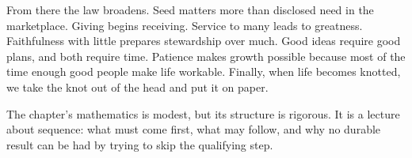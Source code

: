 From there the law broadens. Seed matters more than disclosed need in the marketplace. Giving begins receiving. Service to many leads to greatness. Faithfulness with little prepares stewardship over much. Good ideas require good plans, and both require time. Patience makes growth possible because most of the time enough good people make life workable. Finally, when life becomes knotted, we take the knot out of the head and put it on paper.

The chapter's mathematics is modest, but its structure is rigorous. It is a lecture about sequence: what must come first, what may follow, and why no durable result can be had by trying to skip the qualifying step.
